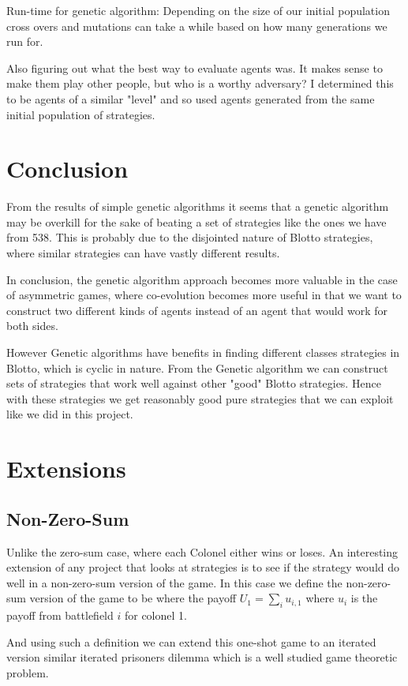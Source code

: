 \documentclass[12pt,letter]{article}
\begin{document}
Run-time for genetic algorithm: Depending on the size of our initial population cross overs and mutations can take a while based on how many generations we run for.

Also figuring out what the best way to evaluate agents was. It makes sense to make them play other people, but who is a worthy adversary? I determined this to be agents of a similar "level" and so used agents generated from the same initial population of strategies.

\section{Conclusion}
From the results of simple genetic algorithms it seems that a genetic algorithm may be overkill for the sake of beating a set of strategies like the ones we have from 538. This is probably due to the disjointed nature of Blotto strategies, where similar strategies can have vastly different results.

In conclusion, the genetic algorithm approach becomes more valuable in the case of asymmetric games, where co-evolution becomes more useful in that we want to construct two different kinds of agents instead of an agent that would work for both sides.

However Genetic algorithms have benefits in finding different classes strategies in Blotto, which is cyclic in nature. From the Genetic algorithm we can construct sets of strategies that work well against other "good" Blotto strategies. Hence with these strategies we get reasonably good pure strategies that we can exploit like we did in this project.

\section{Extensions}
\subsection{Non-Zero-Sum}
Unlike the zero-sum case, where each Colonel either wins or loses. An interesting extension of any project that looks at strategies is to see if the strategy would do well in a non-zero-sum version of the game. In this case we define the non-zero-sum version of the game to be where the payoff $U_1 = \sum_i u_{i, 1}$ where $u_i$ is the payoff from battlefield $i$ for colonel 1.

And using such a definition we can extend this one-shot game to an iterated version similar iterated prisoners dilemma which is a well studied game theoretic problem.
\end{document}
